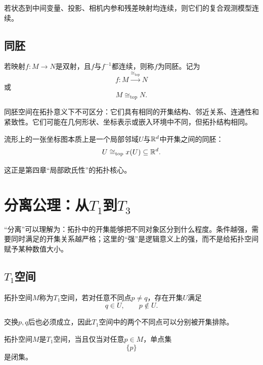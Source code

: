 \begin{corollary}[观测链连续]
若状态到中间变量、投影、相机内参和残差映射均连续，则它们的复合观测模型连续。
\end{corollary}

\subsection{同胚}

\begin{definition}[同胚]
若映射$f:M\to N$是双射，且$f$与$f^{-1}$都连续，则称$f$为同胚。记为
\[
    f:M\xrightarrow{\cong_{\mathrm{top}}}N
\]
或
\[
    M\cong_{\mathrm{top}}N.
\]
\end{definition}

同胚空间在拓扑意义下不可区分：它们具有相同的开集结构、邻近关系、连通性和紧致性。它们可能在几何形状、坐标表示或嵌入环境中不同，但拓扑结构相同。

\begin{proposition}[坐标图思想]
流形上的一张坐标图本质上是一个局部邻域$U$与$\mathbb{R}^d$中开集之间的同胚：
\[
    U\cong_{\mathrm{top}}x(U)\subseteq\mathbb{R}^d.
\]
\end{proposition}

这正是第四章“局部欧氏性”的拓扑核心。


\section{分离公理：从\texorpdfstring{$T_1$}{T1}到\texorpdfstring{$T_3$}{T3}}

“分离”可以理解为：拓扑中的开集能够把不同对象区分到什么程度。条件越强，需要同时满足的开集关系越严格；这里的“强”是逻辑意义上的强，而不是给拓扑空间赋予某种数值大小。

\subsection{\(T_1\)空间}

\begin{definition}[$T_1$空间]
拓扑空间$M$称为$T_1$空间，若对任意不同点$p\neq q$，存在开集$U$满足
\[
    q\in U,\qquad p\notin U.
\]
\end{definition}

交换$p,q$后也必须成立，因此$T_1$空间中的两个不同点可以分别被开集排除。

\begin{theorem}[$T_1$与单点闭集]
拓扑空间$M$是$T_1$空间，当且仅当对任意$p\in M$，单点集
\[
    \{p\}
\]
是闭集。
\end{theorem}

